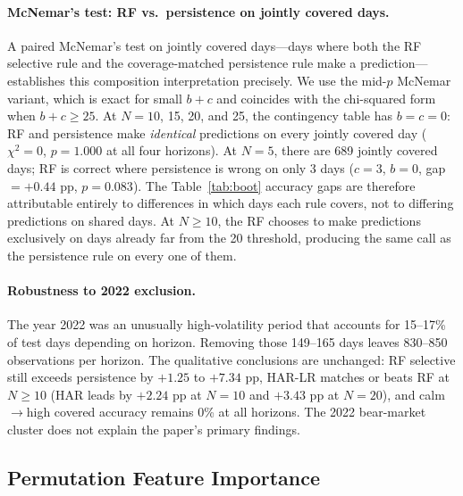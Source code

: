 \documentclass[12pt]{article}
\begin{document}
\paragraph{McNemar's test: RF vs.\ persistence on jointly covered days.}
A paired McNemar's test on jointly covered days---days where both the RF selective rule and the coverage-matched persistence rule make a prediction---establishes this composition interpretation precisely. We use the mid-$p$ McNemar variant, which is exact for small $b + c$ and coincides with the chi-squared form when $b + c \geq 25$. At $N = 10$, 15, 20, and 25, the contingency table has $b = c = 0$: RF and persistence make \emph{identical} predictions on every jointly covered day ($\chi^2 = 0$, $p = 1.000$ at all four horizons). At $N = 5$, there are 689 jointly covered days; RF is correct where persistence is wrong on only 3 days ($c = 3$, $b = 0$, gap $= {+}0.44$ pp, $p = 0.083$). The Table~\ref{tab:boot} accuracy gaps are therefore attributable entirely to differences in which days each rule covers, not to differing predictions on shared days. At $N \geq 10$, the RF chooses to make predictions exclusively on days already far from the 20 threshold, producing the same call as the persistence rule on every one of them.

\paragraph{Robustness to 2022 exclusion.}
The year 2022 was an unusually high-volatility period that accounts for 15--17\% of test days depending on horizon. Removing those 149--165 days leaves 830--850 observations per horizon. The qualitative conclusions are unchanged: RF selective still exceeds persistence by $+1.25$ to $+7.34$ pp, HAR-LR matches or beats RF at $N \geq 10$ (HAR leads by $+2.24$ pp at $N = 10$ and $+3.43$ pp at $N = 20$), and calm$\to$high covered accuracy remains 0\% at all horizons. The 2022 bear-market cluster does not explain the paper's primary findings.

\subsection{Permutation Feature Importance}
\end{document}
